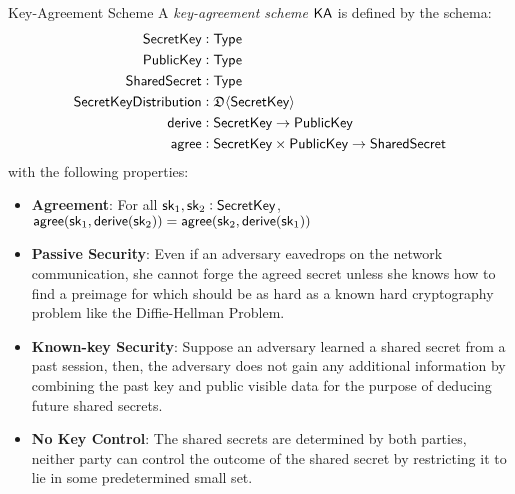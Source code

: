 \begin{definitiontoc}{Key-Agreement Scheme}
    A \emph{key-agreement scheme} ${\textsf{KA}}$ is defined by the schema:
    \begin{align*}
        {\textsf{SecretKey}}    &: {\textsf{Type}} \\
        {\textsf{PublicKey}}    &: {\textsf{Type}} \\
        {\textsf{SharedSecret}} &: {\textsf{Type}} \\
        {\textsf{SecretKeyDistribution}} &: \mathfrak{D}\langle{{\textsf{SecretKey}}}\rangle \\
        {\textsf{derive}}       &: {\textsf{SecretKey}} \to {\textsf{PublicKey}} \\
        {\textsf{agree}}        &: {\textsf{SecretKey}} \times {\textsf{PublicKey}} \to {\textsf{SharedSecret}}
    \end{align*}
    with the following properties:
    \begin{itemize}
        \item \textbf{Agreement}: For all ${\textsf{sk}}_1, {\textsf{sk}}_2 : {\textsf{SecretKey}}$, ${\textsf{agree}}({\textsf{sk}}_1, {\textsf{derive}}({\textsf{sk}}_2)) = {\textsf{agree}}({\textsf{sk}}_2, {\textsf{derive}}({\textsf{sk}}_1))$
        \item \textbf{Passive Security}: Even if an adversary eavedrops on the network communication, she cannot forge the agreed secret unless she knows how to find a preimage for \derive{} which should be as hard as a known hard cryptography problem like the Diffie-Hellman Problem.
        \item \textbf{Known-key Security}: Suppose an adversary learned a shared secret from a past session, then, the adversary does not gain any additional information by combining the past key and public visible data for the purpose of deducing future shared secrets.
        \item \textbf{No Key Control}: The shared secrets are determined by both parties, neither party can control the outcome of the shared secret by restricting it to lie in some predetermined small set.
    \end{itemize}
\end{definitiontoc}

